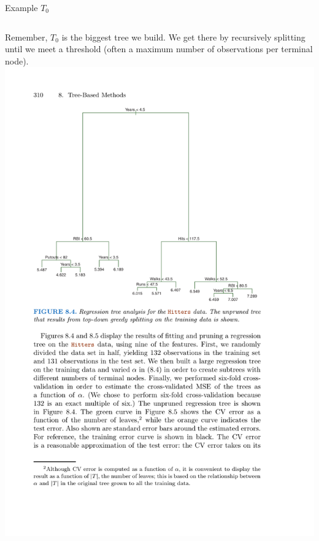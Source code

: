 \documentclass[mathserif, aspectratio=169]{beamer}
\begin{document}
\begin{frame}{Example $T_0$}
\begin{columns}
Remember, $T_0$ is the biggest tree we build.  We get there by recursively splitting until we meet a threshold (often a maximum number of observations per terminal node).
\includegraphics[height=0.9\textheight]{complex_tree}

\end{columns}

\end{frame}
\end{document}
